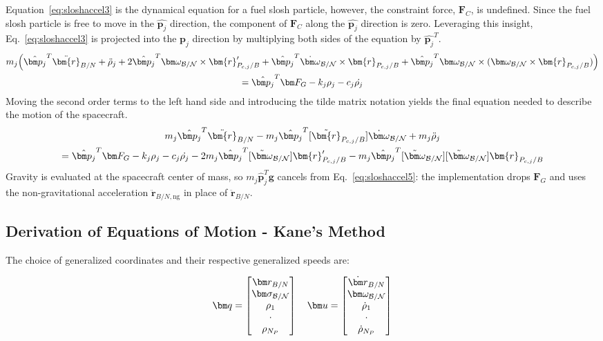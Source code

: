 Equation~\eqref{eq:sloshaccel3} is the dynamical equation for a fuel slosh particle, however, the constraint force, $\bm F_C$, is undefined. Since the fuel slosh particle is free to move in the $\hat{\bm p_j}$ direction, the component of $\bm F_C$ along the $\hat{\bm p_j}$ direction is zero. Leveraging this insight, Eq.~\eqref{eq:sloshaccel3} is projected into the $\hat{\bm p_j}$ direction by multiplying both sides of the equation by $\hat{\bm p_j}^T$.
\begin{multline}
	m_j \Bigl(\hat{\bm p_j}^T \ddot{\bm{r}}_{B/N} + \ddot{\rho}_j  +2 \hat{\bm p_j}^T  \bm\omega_{\cal B/N} \times \bm{r}'_{P_{c,j}/B} + \hat{\bm p_j}^T \dot{\bm\omega}_{\cal B/N} \times \bm{r}_{P_{c,j}/B}  + \hat{\bm p_j}^T \bm\omega_{\cal B/N} \times (\bm\omega_{\cal B/N} \times \bm{r}_{P_{c,j}/B})\Bigr)\\
	= \hat{\bm p_j}^T \bm F_G - k_j \rho_j - c_j \dot{\rho_j}
	\label{eq:sloshaccel4}
\end{multline}
Moving the second order terms to the left hand side and introducing the tilde matrix notation yields the final equation needed to describe the motion of the spacecraft.
\begin{multline}
	m_j \hat{\bm p_j}^T \ddot{\bm{r}}_{B/N} - m_j \hat{\bm p_j}^T [\tilde{\bm{r}}_{P_{c,j}/B}] \dot{\bm\omega}_{\cal B/N} + m_j \ddot{\rho}_j  \\
	= \hat{\bm p_j}^T \bm F_G - k_j \rho_j - c_j \dot{\rho_j} - 2 m_j \hat{\bm p_j}^T  [\tilde{\bm\omega}_{\cal B/N}] \bm{r}'_{P_{c,j}/B}  - m_j \hat{\bm p_j}^T [\tilde{\bm\omega}_{\cal B/N}] [\tilde{\bm\omega}_{\cal B/N}] \bm{r}_{P_{c,j}/B}
	\label{eq:sloshaccel5}
\end{multline}
Gravity is evaluated at the spacecraft center of mass, so $m_j\hat{\bm p}_j^T\bm g$ cancels from Eq.~\eqref{eq:sloshaccel5}: the implementation drops $\bm F_G$ and uses the non-gravitational acceleration $\ddot{\bm r}_{B/N,\text{ng}}$ in place of $\ddot{\bm r}_{B/N}$.

\subsection{Derivation of Equations of Motion - Kane's Method}

The choice of generalized coordinates and their respective generalized speeds are:

\begin{equation}
	\bm q =
	\begin{bmatrix}
		\bm r_{B/N}\\
		\bm \sigma_{\cal{B/N}}\\
		\rho_1\\
		\cdot\\
		\rho_{N_P}
	\end{bmatrix}
	\quad
	\bm u = \begin{bmatrix}
		\dot{\bm r}_{B/N}\\
		\bm \omega_{\cal{B/N}}\\
		\dot{\rho}_1\\
		\cdot\\
		\dot{\rho}_{N_P}
	\end{bmatrix}
\end{equation}

